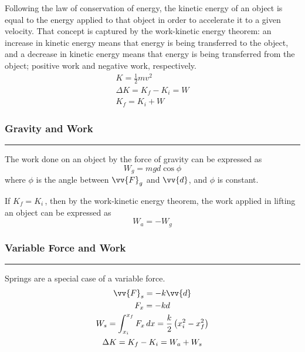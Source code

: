 \documentclass{article}
\begin{document}
    \medskip\noindent
    Following the law of conservation of energy, the kinetic energy of an object is equal to the energy applied to that object in order to accelerate it to a given velocity.
    That concept is captured by the work-kinetic energy theorem: an increase in kinetic energy means that energy is being transferred to the object, and a decrease in kinetic energy means that energy is being transferred from the object; positive work and negative work, respectively.
    \begin{gather*}
        K=\frac{1}{2}mv^2                   \\
        \Delta K = K_f - K_i = W            \\[.3em]
        K_f = K_i + W
    \end{gather*}

    \smallskip
    \subsubsection*{Gravity and Work}
    \vspace{-1em}
    \rule{\linewidth}{.1mm}

    \smallskip\noindent
    The work done on an object by the force of gravity can be expressed as
    \[
        W_g = mgd\cos\phi
    \]
    \noindent
    where $\phi$ is the angle between $\vv{F}_g$ and $\vv{d}$, and $\phi$ is constant.

    \medskip\noindent
    If $K_f=K_i$\,, then by the work-kinetic energy theorem, the work applied in lifting an object can be expressed as
    \[
        W_a = -W_g
    \]

    \smallskip
    \subsubsection*{Variable Force and Work}
    \vspace{-1em}
    \rule{\linewidth}{.1mm}

    \smallskip\noindent
    Springs are a special case of a variable force.
    \begin{gather*}
        \vv{F}_s=-k\vv{d}   \\
        F_x=-kd             \\
        W_s=\int_{x_i}^{x_f} F_x \,dx = \frac{k}{2}\left(x_i^2-x_f^2\right)     \\
        \Delta K = K_f - K_i = W_a + W_s
    \end{gather*}
\end{document}
